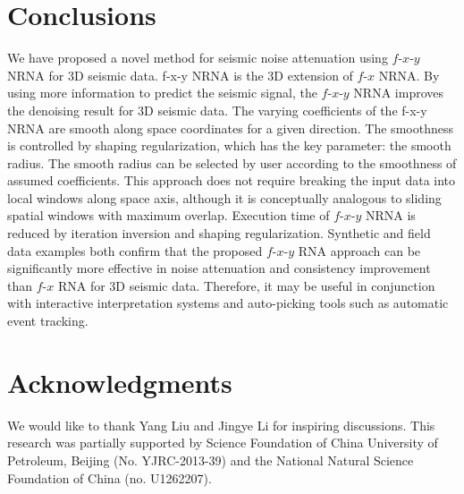 \section{Conclusions}

We have proposed a novel method for seismic noise attenuation using $f$-$x$-$y$ NRNA for 3D seismic data. 
f-x-y NRNA is the 3D extension of $f$-$x$ NRNA. By using more information to predict the seismic signal, 
the $f$-$x$-$y$ NRNA improves the denoising result for 3D seismic data. The varying coefficients of the 
f-x-y NRNA are smooth along space coordinates for a given direction. The smoothness is controlled 
by shaping regularization, which has the key parameter: the smooth radius. The smooth radius can 
be selected by user according to the smoothness of assumed coefficients. This approach does not 
require breaking the input data into local windows along space axis, although it is conceptually 
analogous to sliding spatial windows with maximum overlap. Execution time of $f$-$x$-$y$ NRNA is reduced 
by iteration inversion and shaping regularization. Synthetic and field data examples both confirm 
that the proposed $f$-$x$-$y$ RNA approach can be significantly more effective in noise attenuation and 
consistency improvement than $f$-$x$ RNA for 3D seismic data. Therefore, it may be useful in conjunction 
with interactive interpretation systems and auto-picking tools such as automatic event tracking. 

\section{Acknowledgments}

We would like to thank Yang Liu and Jingye Li for inspiring discussions. 
This research was partially supported by Science Foundation of China University 
of Petroleum, Beijing (No. YJRC-2013-39) and the National Natural Science 
Foundation of China (no. U1262207).








